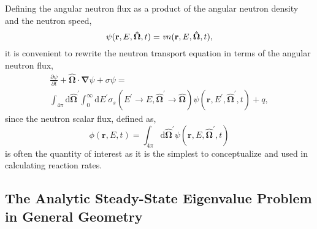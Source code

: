  \noindent
	\indent Defining the angular neutron flux as a product of the angular neutron density and
	the neutron speed,
	\begin{equation}
		\psi(\mathbf{r},E,\mathbf{\hat{\Omega}},t) = \emph{v} {n}
			(\mathbf{r},E,\mathbf{\hat{\Omega}},t),
	\end{equation}
	 it is convenient to rewrite the neutron transport equation in terms of the angular neutron flux,
	 \begin{multline}
		\frac{\partial{\psi}}{\partial{t}}+\mathbf{\hat{\Omega}} \!\cdot\! \mathbf{\nabla}{\psi}
		 + \sigma{\psi} = \\ \int_{4\pi} \mathrm{d}\mathbf{\hat{\Omega}}^{'}
		 \int_{0}^{\infty}\mathrm{d}{E}^{'}\sigma_{s}({E}^{'}\rightarrow{E},
		 \mathbf{\hat{\Omega}}^{'}\rightarrow\mathbf{\hat{\Omega}}) 
		 \psi(\mathbf{r},{E}^{'},\mathbf{\hat{\Omega}}^{'},t)+q,
	\end{multline}
	 since the neutron scalar flux, defined as, 
	 \begin{equation}
		\phi(\mathbf{r},{E},t) = \int_{4\pi}
		\mathrm{d}\mathbf{\hat{\Omega}}^{'}\psi(\mathbf{r},{E},\mathbf{\hat{\Omega}}^{'},t)
	\end{equation}
	is often the quantity of interest as it is the simplest to conceptualize and used in
	calculating reaction rates.  

\belowSubSecSkip

\subsection{The Analytic Steady-State Eigenvalue Problem in General Geometry}
\label{sec:Transport-EigenGen}


